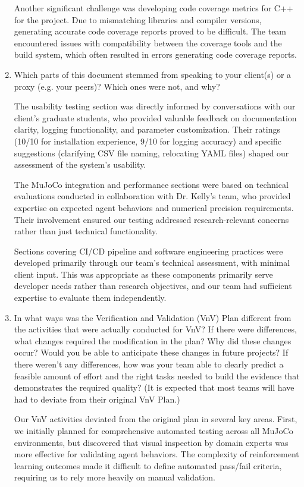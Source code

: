 \documentclass[12pt, titlepage]{article}
\begin{document}
\begin{enumerate}
    Another significant challenge was developing code coverage metrics for C++ for the project. Due to mismatching libraries and compiler versions, generating accurate code coverage reports proved to be difficult. The team encountered issues with compatibility between the coverage tools and the build system, which often resulted in errors generating code coverage reports.

  \item Which parts of this document stemmed from speaking to your client(s) or
  a proxy (e.g. your peers)? Which ones were not, and why?
  
  The usability testing section was directly informed by conversations with our client's graduate students, who provided valuable feedback on documentation clarity, logging functionality, and parameter customization. Their ratings (10/10 for installation experience, 9/10 for logging accuracy) and specific suggestions (clarifying CSV file naming, relocating YAML files) shaped our assessment of the system's usability.

  The MuJoCo integration and performance sections were based on technical evaluations conducted in collaboration with Dr. Kelly's team, who provided expertise on expected agent behaviors and numerical precision requirements. Their involvement ensured our testing addressed research-relevant concerns rather than just technical functionality.

  Sections covering CI/CD pipeline and software engineering practices were developed primarily through our team's technical assessment, with minimal client input. This was appropriate as these components primarily serve developer needs rather than research objectives, and our team had sufficient expertise to evaluate them independently.

  \item In what ways was the Verification and Validation (VnV) Plan different
  from the activities that were actually conducted for VnV?  If there were
  differences, what changes required the modification in the plan?  Why did
  these changes occur?  Would you be able to anticipate these changes in future
  projects?  If there weren't any differences, how was your team able to clearly
  predict a feasible amount of effort and the right tasks needed to build the
  evidence that demonstrates the required quality?  (It is expected that most
  teams will have had to deviate from their original VnV Plan.)
  
  Our VnV activities deviated from the original plan in several key areas. First, we initially planned for comprehensive automated testing across all MuJoCo environments, but discovered that visual inspection by domain experts was more effective for validating agent behaviors. The complexity of reinforcement learning outcomes made it difficult to define automated pass/fail criteria, requiring us to rely more heavily on manual validation.


\end{enumerate}
\end{document}
